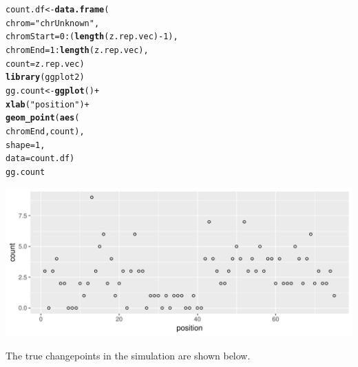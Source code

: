 \documentclass[12pt]{article}\usepackage[]{graphicx}\usepackage[]{color}
\makeatletter
\def\maxwidth{ %
  \ifdim\Gin@nat@width>\linewidth
    \linewidth
  \else
    \Gin@nat@width
  \fi
}
\newcommand{\hlnum}[1]{\textcolor[rgb]{0.686,0.059,0.569}{#1}}%
\newcommand{\hlstr}[1]{\textcolor[rgb]{0.192,0.494,0.8}{#1}}%
\newcommand{\hlopt}[1]{\textcolor[rgb]{0,0,0}{#1}}%
\newcommand{\hlstd}[1]{\textcolor[rgb]{0.345,0.345,0.345}{#1}}%
\newcommand{\hlkwb}[1]{\textcolor[rgb]{0.69,0.353,0.396}{#1}}%
\newcommand{\hlkwc}[1]{\textcolor[rgb]{0.333,0.667,0.333}{#1}}%
\newcommand{\hlkwd}[1]{\textcolor[rgb]{0.737,0.353,0.396}{\textbf{#1}}}%
\newenvironment{kframe}{%
 \def\at@end@of@kframe{}%
 \ifinner\ifhmode%
  \def\at@end@of@kframe{\end{minipage}}%
  \begin{minipage}{\columnwidth}%
 \fi\fi%
 \def\FrameCommand##1{\hskip\@totalleftmargin \hskip-\fboxsep
 \colorbox{shadecolor}{##1}\hskip-\fboxsep
     \hskip-\linewidth \hskip-\@totalleftmargin \hskip\columnwidth}%
 \MakeFramed {\advance\hsize-\width
   \@totalleftmargin\z@ \linewidth\hsize
   \@setminipage}}%
 {\par\unskip\endMakeFramed%
 \at@end@of@kframe}
\newenvironment{knitrout}{}{} %
\makeatother
\begin{document}
\begin{knitrout}
\color{fgcolor}\begin{kframe}
\begin{alltt}
\hlstd{count.df} \hlkwb{<-} \hlkwd{data.frame}\hlstd{(}
  \hlkwc{chrom}\hlstd{=}\hlstr{"chrUnknown"}\hlstd{,}
  \hlkwc{chromStart}\hlstd{=}\hlnum{0}\hlopt{:}\hlstd{(}\hlkwd{length}\hlstd{(z.rep.vec)}\hlopt{-}\hlnum{1}\hlstd{),}
  \hlkwc{chromEnd}\hlstd{=}\hlnum{1}\hlopt{:}\hlkwd{length}\hlstd{(z.rep.vec),}
  \hlkwc{count}\hlstd{=z.rep.vec)}
\hlkwd{library}\hlstd{(ggplot2)}
\hlstd{gg.count} \hlkwb{<-} \hlkwd{ggplot}\hlstd{()}\hlopt{+}
  \hlkwd{xlab}\hlstd{(}\hlstr{"position"}\hlstd{)}\hlopt{+}
  \hlkwd{geom_point}\hlstd{(}\hlkwd{aes}\hlstd{(}
    \hlstd{chromEnd, count),}
    \hlkwc{shape}\hlstd{=}\hlnum{1}\hlstd{,}
    \hlkwc{data}\hlstd{=count.df)}
\hlstd{gg.count}
\end{alltt}
\end{kframe}

{\centering \includegraphics[width=\maxwidth]{figure/ggcount-1} 

}



\end{knitrout}

The true changepoints in the simulation are shown below.
\end{document}
